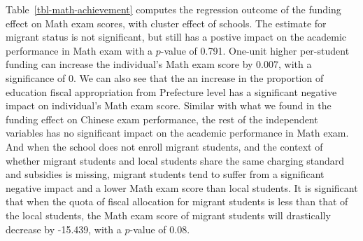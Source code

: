 \documentclass[
  man,
  floatsintext,
  longtable,
  nolmodern,
  notxfonts,
  notimes,
  colorlinks=true,linkcolor=blue,citecolor=blue,urlcolor=blue]{apa7}
\begin{document}
Table~\ref{tbl-math-achievement} computes the regression outcome of the
funding effect on Math exam scores, with cluster effect of schools. The
estimate for migrant status is not significant, but still has a postive
impact on the academic performance in Math exam with a \(p\)-value of
0.791. One-unit higher per-student funding can increase the individual's
Math exam score by 0.007, with a significance of 0. We can also see that
the an increase in the proportion of education fiscal appropriation from
Prefecture level has a significant negative impact on individual's Math
exam score. Similar with what we found in the funding effect on Chinese
exam performance, the rest of the independent variables has no
significant impact on the academic performance in Math exam. And when
the school does not enroll migrant students, and the context of whether
migrant students and local students share the same charging standard and
subsidies is missing, migrant students tend to suffer from a significant
negative impact and a lower Math exam score than local students. It is
significant that when the quota of fiscal allocation for migrant
students is less than that of the local students, the Math exam score of
migrant students will drastically decrease by -15.439, with a
\(p\)-value of 0.08.
\end{document}
